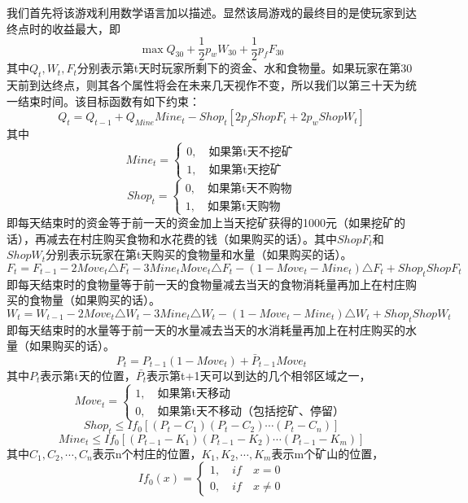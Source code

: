 \documentclass[withoutpreface,bwprint]{cumcmthesis} %
\begin{document}
我们首先将该游戏利用数学语言加以描述。显然该局游戏的最终目的是使玩家到达终点时的收益最大，即
\begin{equation}
	\max Q_{30}+\frac{1}{2}p_wW_{30}+\frac{1}{2}p_fF_{30}
\end{equation}
其中$Q_{t},W_{t},F_{t}$分别表示第t天时玩家所剩下的资金、水和食物量。如果玩家在第30天前到达终点，则其各个属性将会在未来几天视作不变，所以我们以第三十天为统一结束时间。该目标函数有如下约束：
\begin{equation}
	Q_t=Q_{t-1}+Q_{Mine}Mine_t-Shop_t[2p_fShopF_t+2p_wShopW_t]
\end{equation}
其中$$Mine_t=\begin{cases}
0,\quad \text{如果第t天不挖矿}\\
1,\quad \text{如果第t天挖矿}
\end{cases}$$
$$Shop_t=\begin{cases}
0,\quad \text{如果第t天不购物}\\
1,\quad \text{如果第t天购物}
\end{cases}$$
即每天结束时的资金等于前一天的资金加上当天挖矿获得的1000元（如果挖矿的话），再减去在村庄购买食物和水花费的钱（如果购买的话）。其中$ShopF_t$和$ShopW_t$分别表示玩家在第t天购买的食物量和水量（如果购买的话）。
\begin{equation}
F_t=F_{t-1}-2Move_t\triangle F_t-3Mine_tMove_t\triangle F_t-(1-Move_t-Mine_t)\triangle F_t+Shop_tShopF_t
\end{equation}
即每天结束时的食物量等于前一天的食物量减去当天的食物消耗量再加上在村庄购买的食物量（如果购买的话）。
\begin{equation}
W_t=W_{t-1}-2Move_t\triangle W_t-3Mine_t\triangle W_t-(1-Move_t-Mine_t)\triangle W_t+Shop_tShopW_t
\end{equation}
即每天结束时的水量等于前一天的水量减去当天的水消耗量再加上在村庄购买的水量（如果购买的话）。
\begin{equation}
P_{t}=P_{t-1}(1-Move_t)+\bar{P}_{t-1}Move_t
\end{equation}
其中$P_t$表示第t天的位置，$\bar{P_t}$表示第t+1天可以到达的几个相邻区域之一，
$$Move_t=\begin{cases}
1,\quad \text{如果第t天移动}\\
0,\quad \text{如果第t天不移动（包括挖矿、停留）}
\end{cases}$$
\begin{equation}
Shop_t\leqslant If_0[(P_t-C_1)(P_t-C_2)\cdots(P_t-C_n)]
\end{equation}
\begin{equation}
Mine_t\leqslant If_0[(P_{t-1}-K_1)(P_{t-1}-K_2)\cdots(P_{t-1}-K_m)]
\end{equation}其中$C_1,C_2,\cdots,C_n$表示n个村庄的位置，$K_1,K_2,\cdots,K_m$表示m个矿山的位置，
$$If_0(x)=\begin{cases}
1,\quad if\quad x=0\\
0,\quad if\quad x\neq0
\end{cases}$$
\end{document}
